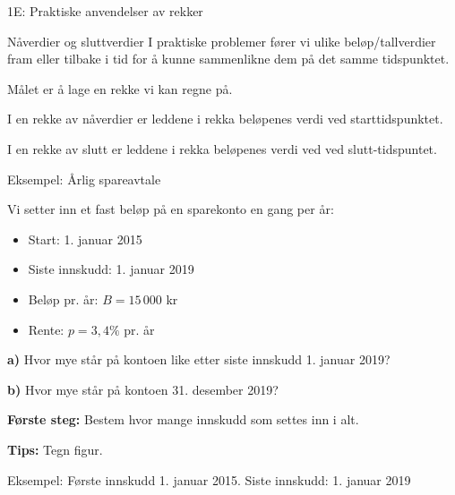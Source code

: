 \begin{frame}{1E: Praktiske anvendelser av rekker}
\begin{red*}{Nåverdier og sluttverdier}
I praktiske problemer fører vi ulike beløp/tallverdier fram eller tilbake i tid for å kunne sammenlikne dem på det samme tidspunktet.

\medskip
Målet er å lage en rekke vi kan regne på.

\medskip
I en rekke av nåverdier er leddene i rekka beløpenes verdi ved starttidspunktet. 

\medskip
I en rekke av slutt er leddene i rekka beløpenes verdi ved ved slutt-tidspuntet. 
\end{red*}
\end{frame}

\greenheader
\begin{frame}{Eksempel: Årlig spareavtale}


Vi setter inn et fast beløp på en sparekonto en gang per år:

\begin{itemize}
  \item Start: 1. januar 2015
   \item Siste innskudd: 1. januar 2019
  \item Beløp pr. år: $B = 15\,000$ kr
  \item Rente: $p = 3{,}4\%$ pr. år
\end{itemize}

\medskip
\textbf{a)} Hvor mye står på kontoen like etter siste innskudd 1. januar 2019?

\medskip
\textbf{b)} Hvor mye står på kontoen 31. desember 2019?

\medskip
\textbf{Første steg:} Bestem hvor mange innskudd som settes inn i alt.

\medskip
\textbf{Tips:} Tegn figur.
\end{frame}

\begin{frame}[t]{Eksempel: Første innskudd 1. januar 2015. Siste innskudd: 1. januar 2019}
\begin{center}
\end{center}

\end{frame}

